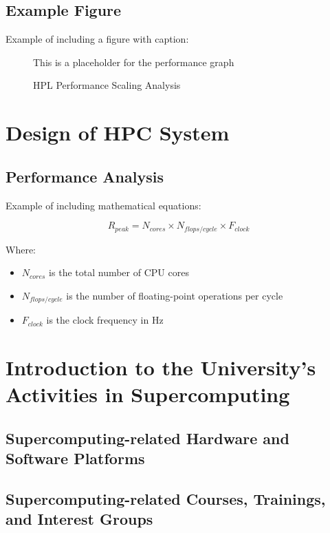 \documentclass[a4paper,12pt]{article}
\begin{document}
\subsection{Example Figure}
Example of including a figure with caption:

\begin{figure}[H]
\centering
This is a placeholder for the performance graph
\caption{HPL Performance Scaling Analysis}
\label{fig:performance}
\end{figure}

\newpage

\section{Design of HPC System}

\subsection{Performance Analysis}
Example of including mathematical equations:

\begin{equation}
R_{peak} = N_{cores} \times N_{flops/cycle} \times F_{clock}
\end{equation}

Where:
\begin{itemize}
    \item \(N_{cores}\) is the total number of CPU cores
    \item \(N_{flops/cycle}\) is the number of floating-point operations per cycle
    \item \(F_{clock}\) is the clock frequency in Hz
\end{itemize}

\newpage

\section{Introduction to the University's Activities in Supercomputing}

\subsection{Supercomputing-related Hardware and Software Platforms}

\subsection{Supercomputing-related Courses, Trainings, and Interest Groups}
\end{document}
